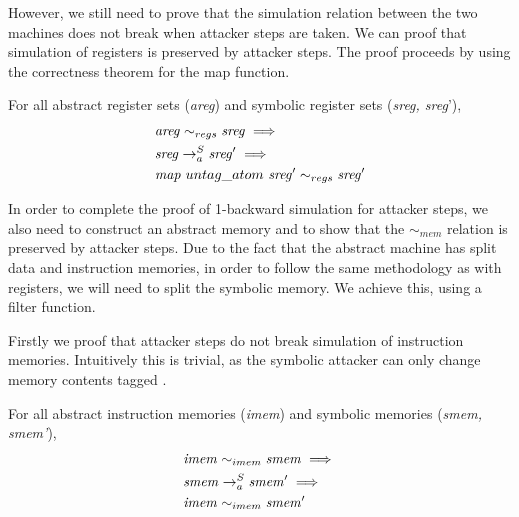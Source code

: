 However, we still need to prove that the simulation relation between
the two machines does not break when attacker steps are taken.
We can proof that simulation of registers is preserved by attacker
steps. The proof proceeds by using the correctness theorem for the map function.

\begin{lemma}
\label{areg_map_preserves_ref}
  For all abstract register sets (\textit{areg})
  and symbolic register sets (\textit{sreg, sreg}'),
  \begin{align*}
    & \mathit{areg} \sim_{regs} \mathit{sreg} \implies \\
    & \stepa{\mathit{sreg}}{\mathit{sreg}'}{S} \implies \\
    & \mathit{map}~untag\_atom~\mathit{sreg}' \sim_{regs} \mathit{sreg}'
  \end{align*}
\end{lemma}

In order to complete the proof of 1-backward simulation for attacker
steps, we also need to construct an abstract memory and to show
that the $\sim_{mem}$ relation is preserved by attacker steps.
Due to the fact that the abstract machine has split data and instruction
memories, in order to follow the same methodology as with registers,
we will need to split the symbolic memory. We achieve this, using a
filter function.

Firstly we proof that attacker steps do not break simulation of
instruction memories. Intuitively this is trivial, as the symbolic
attacker can only change memory contents tagged \DATAname.

\begin{lemma}
\label{imem_attacker_ref}
  For all abstract instruction memories (\textit{imem})
  and symbolic memories (\textit{smem, smem'}),
  \begin{align*}
    & \mathit{imem} \sim_{imem} \mathit{smem} \implies \\
    & \stepa{\mathit{smem}}{\mathit{smem}'}{S} \implies \\
    & \mathit{imem} \sim_{imem} \mathit{smem}'
  \end{align*}
\end{lemma}

